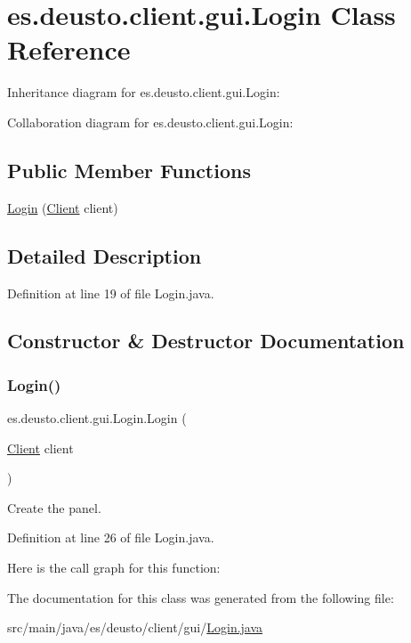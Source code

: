 \hypertarget{classes_1_1deusto_1_1client_1_1gui_1_1_login}{}\section{es.\+deusto.\+client.\+gui.\+Login Class Reference}
\label{classes_1_1deusto_1_1client_1_1gui_1_1_login}


Inheritance diagram for es.\+deusto.\+client.\+gui.\+Login\+:


Collaboration diagram for es.\+deusto.\+client.\+gui.\+Login\+:
\subsection*{Public Member Functions}
\begin{DoxyCompactItemize}
\item 
\mbox{\hyperlink{classes_1_1deusto_1_1client_1_1gui_1_1_login_af565f7accded6e1e3d09b03d6baeaeb4}{Login}} (\mbox{\hyperlink{classes_1_1deusto_1_1client_1_1_client}{Client}} client)
\end{DoxyCompactItemize}


\subsection{Detailed Description}


Definition at line 19 of file Login.\+java.



\subsection{Constructor \& Destructor Documentation}
\mbox{\label{classes_1_1deusto_1_1client_1_1gui_1_1_login_af565f7accded6e1e3d09b03d6baeaeb4}} 
\subsubsection{\texorpdfstring{Login()}{Login()}}
{\footnotesize\ttfamily es.\+deusto.\+client.\+gui.\+Login.\+Login (\begin{DoxyParamCaption}\item[{\mbox{\hyperlink{classes_1_1deusto_1_1client_1_1_client}{Client}}}]{client }\end{DoxyParamCaption})}

Create the panel. 

Definition at line 26 of file Login.\+java.

Here is the call graph for this function\+:


The documentation for this class was generated from the following file\+:\begin{DoxyCompactItemize}
\item 
src/main/java/es/deusto/client/gui/\mbox{\hyperlink{_login_8java}{Login.\+java}}\end{DoxyCompactItemize}
